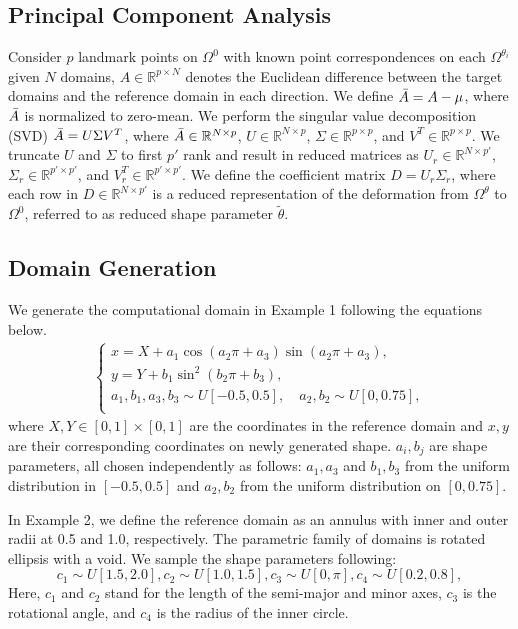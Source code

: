 \documentclass[review]{elsarticle}
\def\Omegatheta{{\Omega^\theta}}
\def\Omegathetai{{\Omega^{\theta_i}}}
\def\refd{0}
\def\Omegaref{{\Omega^\refd}}
\begin{document}
\subsection{Principal Component Analysis}\label{subsec:pca}
Consider $p$ landmark points on $\Omegaref$ with known point correspondences on each $\Omegathetai$ given $N$ domains, $A \in \mathbb{R}^{p\times N}$ denotes the Euclidean difference between the target domains and the reference domain in each direction. We define $\Bar{A} = A - \mu$, where $\Bar{A}$ is normalized to zero-mean. We perform the singular value decomposition (SVD) $\Bar{A} = U\Sigma V^{T}$, where $\Bar{A} \in \mathbb{R}^{N\times p}$, $U  \in \mathbb{R}^{N\times p}$, $\Sigma  \in \mathbb{R}^{p\times p}$, and $V^{T} \in\mathbb{R}^{p\times p}$. We truncate $U$ and $\Sigma$ to first $p'$ rank and result in reduced matrices as $U_{r} \in \mathbb{R}^{N\times p'}$, $\Sigma_{r}  \in \mathbb{R}^{p'\times p'}$, and $V^{T}_{r} \in\mathbb{R}^{p' \times p'}$. We define the coefficient matrix $D = U_{r}\Sigma_{r}$,
where each row in $D \in \mathbb{R}^{N\times p'}$ is a reduced representation of the deformation from $\Omegatheta$ to $\Omegaref$, referred to as reduced shape parameter $\tilde \theta$.


\subsection{Domain Generation}\label{subsec:dom_gen}
We generate the computational domain in Example 1 following the equations below. 
\begin{align*}
\begin{cases}
   x = X + a_{1}\cos{(a_{2}\pi + a_{3})}\sin{(a_{2}\pi + a_{3})}, \\
   y = Y + b_{1}\sin^{2}{(b_{2}\pi + b_{3})},\\
   a_{1},b_{1},a_{3}, b_{3} \sim U[-0.5, 0.5],\quad a_{2},b_{2} \sim U[0, 0.75],\\
\end{cases}
\end{align*}
where $X, Y \in [0,1]\times[0, 1]$ are the coordinates in the reference domain and $x,y$ are their corresponding coordinates on newly generated shape. $a_{i}, b_{j}$ are shape parameters, all chosen independently as follows: $a_1,a_3$ and $b_1,b_3$ from the uniform distribution in $[-0.5, 0.5]$ and $a_{2}, b_{2}$ from the uniform distribution on $[0,0.75]$.

In Example 2, we define the reference domain as an annulus with inner and outer radii at 0.5 and 1.0, respectively. The parametric family of domains is rotated ellipsis with a void. We sample the shape parameters following:
\begin{equation}
    c_{1} \sim U[1.5, 2.0], c_{2} \sim U[1.0, 1.5], c_{3} \sim U[0, \pi], c_{4} \sim U[0.2, 0.8], 
\end{equation}
Here, $c_{1}$ and $c_{2}$ stand for the length of the semi-major and minor axes, $c_{3}$ is the rotational angle, and $c_{4}$ is the radius of the inner circle. 
\end{document}
